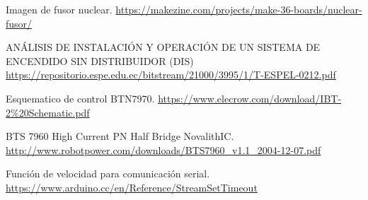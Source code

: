 \documentclass[twoside,22pt]{Latex/Classes/thesisUMSNH}
\begin{document}
\begin{thebibliography}{2}
Imagen de fusor nuclear. \url{https://makezine.com/projects/make-36-boards/nuclear-fusor/}

ANÁLISIS DE INSTALACIÓN Y OPERACIÓN DE UN
SISTEMA DE ENCENDIDO SIN DISTRIBUIDOR (DIS) \url{https://repositorio.espe.edu.ec/bitstream/21000/3995/1/T-ESPEL-0212.pdf}



Esquematico de control BTN7970. \url{https://www.elecrow.com/download/IBT-2\%20Schematic.pdf}

BTS 7960 High Current PN Half Bridge NovalithIC. \url{http://www.robotpower.com/downloads/BTS7960_v1.1_2004-12-07.pdf}

Función de velocidad para comunicación serial. \url{https://www.arduino.cc/en/Reference/StreamSetTimeout}







\end{thebibliography}
\end{document}
